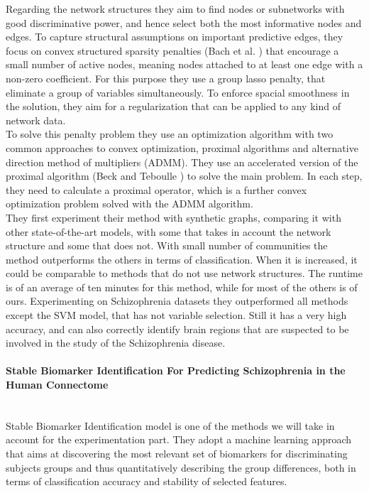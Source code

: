 Regarding the network structures they aim to find nodes or subnetworks with good discriminative power, and hence select both the most informative nodes and edges. To capture structural assumptions on important predictive edges, they focus on convex structured sparsity penalties (Bach et al. \cite{bach2012structured}) that encourage a small number of active nodes, meaning nodes attached to at least one edge with a non-zero coefficient. For this purpose they use a group lasso penalty, that eliminate a group of variables simultaneously. To enforce spacial smoothness in the solution, they aim for a regularization that can be applied to any kind of network data.
\\

To solve this penalty problem they use an optimization algorithm with two common approaches to convex optimization, proximal algorithms and alternative direction method of multipliers (ADMM). They use an accelerated version of the proximal algorithm (Beck and Teboulle \cite{beck2009fast}) to solve the main problem. In each step, they need to calculate a proximal operator, which is a further convex optimization problem solved with the ADMM algorithm.
\\

They first experiment their method with synthetic graphs, comparing it with other state-of-the-art models, with some that takes in account the network structure and some that does not. With small number of communities the method outperforms the others in terms of classification. When it is increased, it could be comparable to methods that do not use network structures. The runtime is of an average of ten minutes for this method, while for most of the others is of ours. 
Experimenting on Schizophrenia datasets they outperformed all methods except the SVM model, that has not variable selection. Still it has a very high accuracy, and can also correctly identify brain regions that are suspected to be involved in the study of the Schizophrenia disease. 

\paragraph{Stable Biomarker Identification For Predicting Schizophrenia in the Human Connectome}\
\\

Stable Biomarker Identification model \cite{GutierrezBio} is one of the methods we will take in account for the experimentation part. They adopt a machine learning approach that aims at discovering the most relevant set of biomarkers for discriminating subjects groups and thus quantitatively describing the group differences, both in terms of classification accuracy and stability of selected features. 
\\

